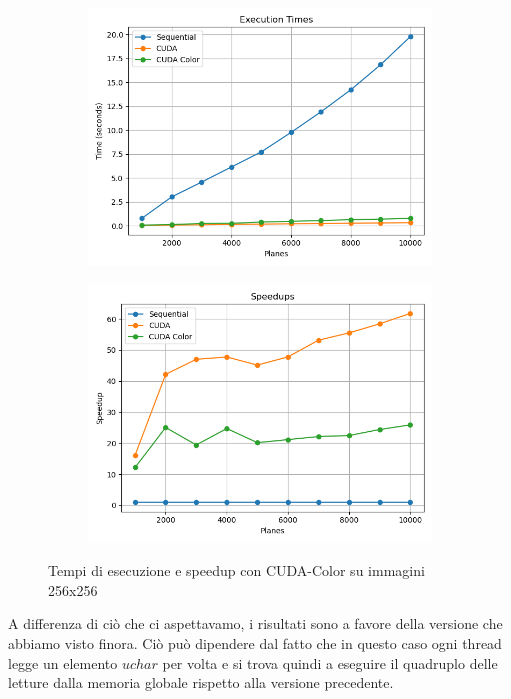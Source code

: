 \begin{figure}[H]
    \centering
    \begin{subfigure}{0.49\textwidth}
        \centering
        \includegraphics[width=\textwidth]{../results/plots/256/cuda_color_times}
    \end{subfigure}
    \begin{subfigure}{0.49\textwidth}
        \centering
        \includegraphics[width=\textwidth]{../results/plots/256/cuda_color_speedup}
    \end{subfigure}
    \caption{Tempi di esecuzione e speedup con CUDA-Color su immagini 256x256}
    \label{fig:cuda_color}
\end{figure}
A differenza di ciò che ci aspettavamo, i risultati sono a favore della versione che abbiamo visto finora.
Ciò può dipendere dal fatto che in questo caso ogni thread legge un elemento $uchar$ per volta e si trova quindi a
eseguire il quadruplo delle letture dalla memoria globale rispetto alla versione precedente.

